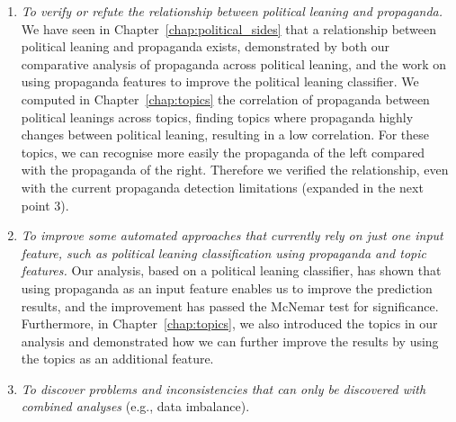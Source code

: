 \begin{enumerate} %
    \item \emph{To verify or refute the relationship between political leaning and propaganda.} %
    We have seen in Chapter~\ref{chap:political_sides} that a relationship between political leaning and propaganda exists, demonstrated by both our comparative analysis of propaganda across political leaning, and the work on using propaganda features to improve the political leaning classifier. %
    We computed in Chapter~\ref{chap:topics} the correlation of propaganda between political leanings across topics, finding topics where propaganda highly changes between political leaning, resulting in a low correlation. For these topics, we can recognise more easily the propaganda of the left compared with the propaganda of the right. Therefore we verified the relationship, even with the current propaganda detection limitations (expanded in the next point 3).
    \item \emph{To improve some automated approaches that currently rely on just one input feature, such as political leaning classification using propaganda and topic features.}
    Our analysis, based on a political leaning classifier, has shown that using propaganda as an input feature enables us to improve the prediction results, and the improvement has passed the McNemar test for significance. Furthermore, in Chapter~\ref{chap:topics}, we also introduced the topics in our analysis and demonstrated how we can further improve the results by using the topics as an additional feature.
    \item \emph{To discover problems and inconsistencies that can only be discovered with combined analyses} (e.g., data imbalance). %

\end{enumerate}

